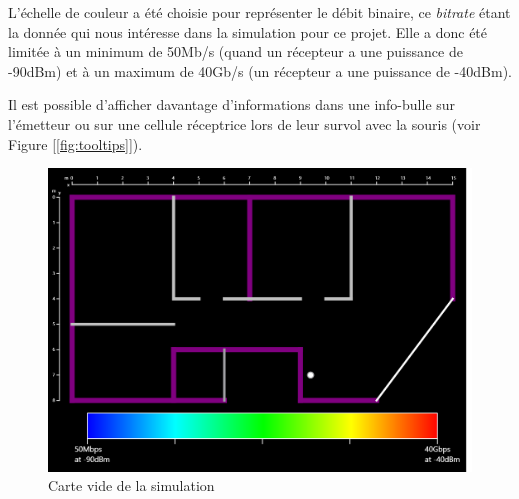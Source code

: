 L'échelle de couleur a été choisie pour représenter le débit binaire, ce \textit{bitrate} étant la donnée qui nous intéresse dans la simulation pour ce projet. Elle a donc été limitée à un minimum de 50Mb/s (quand un récepteur a une puissance de -90dBm) et à un maximum de 40Gb/s (un récepteur a une puissance de -40dBm).

Il est possible d'afficher davantage d'informations dans une info-bulle sur l'émetteur ou sur une cellule réceptrice lors de leur survol avec la souris (voir Figure [\ref{fig:tooltips}]).

\begin{figure}[H]
    \centering
    \includegraphics[width=\textwidth]{latex/images/blank_map.png}
    \caption{Carte vide de la simulation}
    \label{fig:blank-map}
\end{figure}

